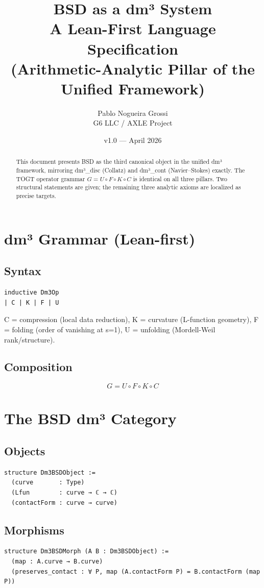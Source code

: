 \documentclass[11pt,a4paper]{article}
\title{\textbf{BSD as a dm³ System}\\
A Lean-First Language Specification \\
(Arithmetic-Analytic Pillar of the Unified Framework)}
\author{Pablo Nogueira Grossi \\ G6 LLC / AXLE Project}
\date{v1.0 — April 2026}
\begin{document}
\maketitle

\begin{abstract}
This document presents BSD as the third canonical object in the unified dm³ framework, mirroring dm³\_disc (Collatz) and dm³\_cont (Navier–Stokes) exactly. The TOGT operator grammar \(G = U \circ F \circ K \circ C\) is identical on all three pillars. Two structural statements are given; the remaining three analytic axioms are localized as precise targets.
\end{abstract}

\section{dm³ Grammar (Lean-first)}

\subsection{Syntax}
\begin{lstlisting}
inductive Dm3Op
| C | K | F | U
\end{lstlisting}
C = compression (local data reduction),  
K = curvature (L-function geometry),  
F = folding (order of vanishing at s=1),  
U = unfolding (Mordell-Weil rank/structure).

\subsection{Composition}
\[
G = U \circ F \circ K \circ C
\]

\section{The BSD dm³ Category}

\subsection{Objects}
\begin{lstlisting}
structure Dm3BSDObject :=
  (curve       : Type)
  (Lfun        : curve → ℂ → ℂ)
  (contactForm : curve → curve)
\end{lstlisting}

\subsection{Morphisms}
\begin{lstlisting}
structure Dm3BSDMorph (A B : Dm3BSDObject) :=
  (map : A.curve → B.curve)
  (preserves_contact : ∀ P, map (A.contactForm P) = B.contactForm (map P))
\end{lstlisting}
\end{document}
